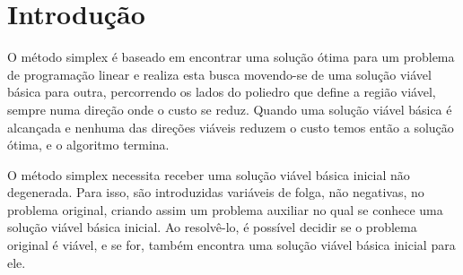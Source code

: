 \documentclass[
	12pt,				%
	openright,			%
	oneside,			%
	a4paper,			%
	english,			%
	french,				%
	spanish,			%
	brazil,				%
	]{abntex2}
\begin{document}
\chapter*[Introdução]{Introdução}

O método simplex é baseado em encontrar uma solução ótima para um problema de programação linear e realiza esta busca movendo-se de uma solução viável básica para outra, percorrendo os lados do poliedro que define a região viável, sempre numa direção onde o custo se reduz. Quando uma solução viável básica é alcançada e nenhuma das direções viáveis reduzem o custo temos então a solução ótima, e o algoritmo termina. 

O método simplex necessita receber uma solução viável básica inicial não degenerada. Para isso, são introduzidas variáveis de folga, não negativas, no problema original, criando assim um problema auxiliar no qual se conhece uma solução viável básica inicial. Ao resolvê-lo, é possível decidir se o problema original é viável, e se for, também encontra uma solução viável básica inicial para ele. 
\end{document}
